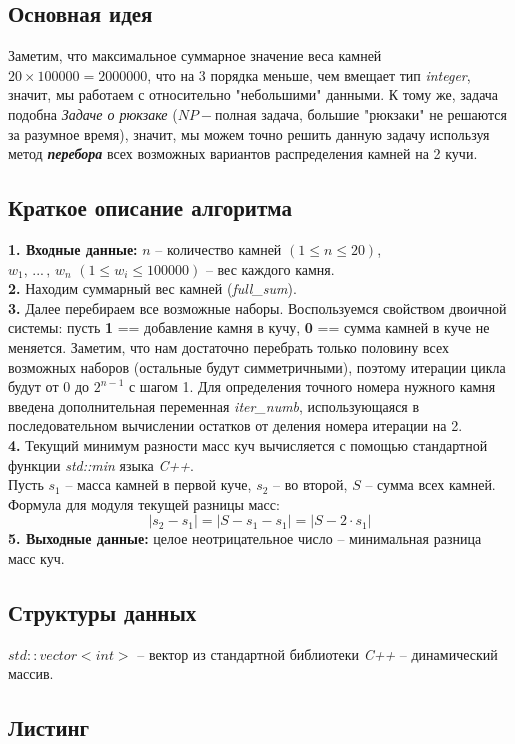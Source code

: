 \documentclass[a5paper, 10pt]{article}
\theoremstyle{definition}
\theoremstyle{plain}
\theoremstyle{remark}
\begin{document}
\subsection{Основная идея}
Заметим, что максимальное суммарное значение веса камней $20 \times 100000 = 2000000$, что на 3 порядка меньше, чем вмещает тип \textit{integer}, значит, мы работаем с относительно "небольшими" данными. К тому же, задача подобна \textit{Задаче о рюкзаке} ($NP-$полная задача, большие "рюкзаки" не решаются за разумное время), значит, мы можем точно решить данную задачу используя метод \textbf{\textit{перебора}} всех возможных вариантов распределения камней на 2 кучи.

\subsection{Краткое описание алгоритма}
\textbf{1. Входные данные:} $n$ -- количество камней $(1 \leq n \leq 20)$, $w_1, \, ... \, , \, w_n \, \, (1 \leq w_i \leq 100000)$ -- вес каждого камня.\\
\textbf{2.} Находим суммарный вес камней (\textit{full\_sum}).\\
\textbf{3.} Далее перебираем все возможные наборы. Воспользуемся свойством двоичной системы: пусть \textbf{1} == добавление камня в кучу, \textbf{0} == сумма камней в куче не меняется. Заметим, что нам достаточно перебрать только половину всех возможных наборов (остальные будут симметричными), поэтому итерации цикла будут от $0$ до $2^{n-1}$ с шагом 1. Для определения точного номера нужного камня введена дополнительная переменная \textit{iter\_numb}, использующаяся в последовательном вычислении остатков от деления номера итерации на 2.\\
\textbf{4.} Текущий минимум разности масс куч вычисляется с помощью стандартной функции \textit{std::min} языка \textit{C++}. \\
Пусть $s_1$ -- масса камней в первой куче, $s_2$ -- во второй, $S$ -- сумма всех камней. Формула для модуля текущей разницы масс: 
$$| s_2 - s_1| = | S - s_1 - s_1| = |S - 2 \cdot s_1|$$
\textbf{5. Выходные данные:} целое неотрицательное число -- минимальная разница масс куч.

\subsection{Структуры данных}
$std::vector<int>$ -- вектор из стандартной библиотеки \textit{C++} -- динамический массив.

\subsection{Листинг}
\end{document}
